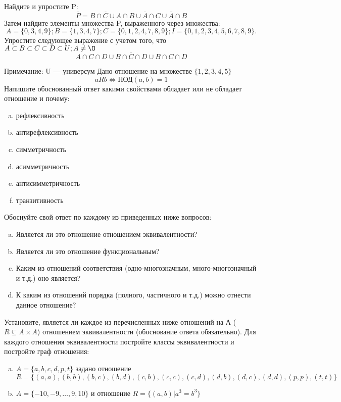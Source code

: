 \documentclass[10pt]{exam}
\begin{document}
\begin{questions}
\question
Найдите и упростите P:
\begin{equation*}
\overline{P} = B \cap \overline{C} \cup A \cap B \cup \overline{A} \cap C \cup \overline{A} \cap B
\end{equation*}
Затем найдите элементы множества P, выраженного через множества:
\begin{equation*}
A = \{0, 3, 4, 9\}; 
B = \{1, 3, 4, 7\};
C = \{0, 1, 2, 4, 7, 8, 9\};
I = \{0, 1, 2, 3, 4, 5, 6, 7, 8, 9\}.
\end{equation*}\question
Упростите следующее выражение с учетом того, что $A\subset B \subset C \subset D \subset U; A \neq \O$
\begin{equation*}
A \cap C  \cap D \cup B \cap \overline{C} \cap D \cup B \cap C \cap D
\end{equation*}

Примечание: U — универсум\question
Дано отношение на множестве $\{1, 2, 3, 4, 5\}$ 
\begin{equation*}
aRb \iff  \text{НОД}(a,b) =1
\end{equation*}
Напишите обоснованный ответ какими свойствами обладает или не обладает отношение и почему:   
\begin{enumerate} [a)]\setcounter{enumi}{0}
\item рефлексивность
\item антирефлексивность
\item симметричность
\item асимметричность
\item антисимметричность
\item транзитивность
\end{enumerate}

Обоснуйте свой ответ по каждому из приведенных ниже вопросов:
\begin{enumerate} [a)]\setcounter{enumi}{0}
    \item Является ли это отношение отношением эквивалентности?
    \item Является ли это отношение функциональным?
    \item Каким из отношений соответствия (одно-многозначным, много-многозначный и т.д.) оно является?
    \item К каким из отношений порядка (полного, частичного и т.д.) можно отнести данное отношение?
\end{enumerate}


\question
Установите, является ли каждое из перечисленных ниже отношений на А ($R \subseteq A \times A$) отношением эквивалентности (обоснование ответа обязательно). Для каждого отношения эквивалентности постройте классы 
эквивалентности и постройте граф отношения:
\begin{enumerate} [a)]\setcounter{enumi}{0}
\item $A = \{a, b, c, d, p, t\}$ задано отношение $R = \{(a, a), (b, b), (b, c), (b, d), (c, b), (c, c), (c, d), (d, b), (d, c), (d, d), (p,p), (t,t)\}$
\item $A = \{-10, -9, … , 9, 10\}$ и отношение $R = \{(a,b)|a^{3} = b^{3}\}$


\end{enumerate}
\end{questions}
\end{document}
